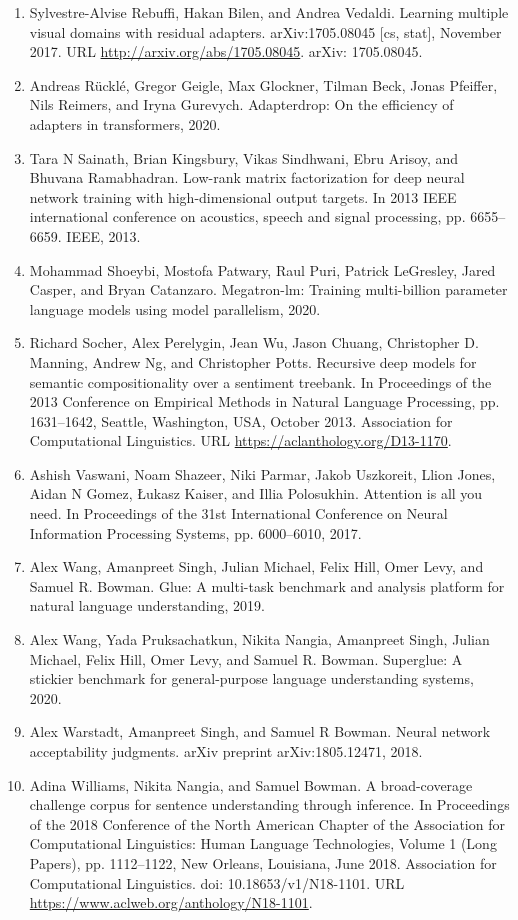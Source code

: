\documentclass[11pt,UTF8,fontset=fandol]{ctexart}
\begin{document}
\begin{enumerate}[leftmargin=2em,itemsep=2pt]
\item Sylvestre-Alvise Rebuffi, Hakan Bilen, and Andrea Vedaldi. Learning multiple visual domains with residual adapters. arXiv:1705.08045 [cs, stat], November 2017. URL \url{http://arxiv.org/abs/1705.08045}. arXiv: 1705.08045.
\item Andreas R\"uckl\'e, Gregor Geigle, Max Glockner, Tilman Beck, Jonas Pfeiffer, Nils Reimers, and Iryna Gurevych. Adapterdrop: On the efficiency of adapters in transformers, 2020.
\item Tara N Sainath, Brian Kingsbury, Vikas Sindhwani, Ebru Arisoy, and Bhuvana Ramabhadran. Low-rank matrix factorization for deep neural network training with high-dimensional output targets. In 2013 IEEE international conference on acoustics, speech and signal processing, pp. 6655--6659. IEEE, 2013.
\item Mohammad Shoeybi, Mostofa Patwary, Raul Puri, Patrick LeGresley, Jared Casper, and Bryan Catanzaro. Megatron-lm: Training multi-billion parameter language models using model parallelism, 2020.
\item Richard Socher, Alex Perelygin, Jean Wu, Jason Chuang, Christopher D. Manning, Andrew Ng, and Christopher Potts. Recursive deep models for semantic compositionality over a sentiment treebank. In Proceedings of the 2013 Conference on Empirical Methods in Natural Language Processing, pp. 1631--1642, Seattle, Washington, USA, October 2013. Association for Computational Linguistics. URL \url{https://aclanthology.org/D13-1170}.
\item Ashish Vaswani, Noam Shazeer, Niki Parmar, Jakob Uszkoreit, Llion Jones, Aidan N Gomez, {\L}ukasz Kaiser, and Illia Polosukhin. Attention is all you need. In Proceedings of the 31st International Conference on Neural Information Processing Systems, pp. 6000--6010, 2017.
\item Alex Wang, Amanpreet Singh, Julian Michael, Felix Hill, Omer Levy, and Samuel R. Bowman. Glue: A multi-task benchmark and analysis platform for natural language understanding, 2019.
\item Alex Wang, Yada Pruksachatkun, Nikita Nangia, Amanpreet Singh, Julian Michael, Felix Hill, Omer Levy, and Samuel R. Bowman. Superglue: A stickier benchmark for general-purpose language understanding systems, 2020.
\item Alex Warstadt, Amanpreet Singh, and Samuel R Bowman. Neural network acceptability judgments. arXiv preprint arXiv:1805.12471, 2018.
\item Adina Williams, Nikita Nangia, and Samuel Bowman. A broad-coverage challenge corpus for sentence understanding through inference. In Proceedings of the 2018 Conference of the North American Chapter of the Association for Computational Linguistics: Human Language Technologies, Volume 1 (Long Papers), pp. 1112--1122, New Orleans, Louisiana, June 2018. Association for Computational Linguistics. doi: 10.18653/v1/N18-1101. URL \url{https://www.aclweb.org/anthology/N18-1101}.

\end{enumerate}
\end{document}
